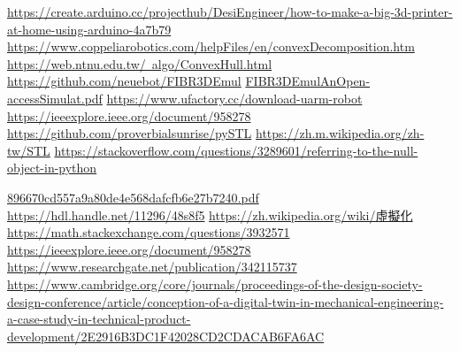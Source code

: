 \newpage
\renewcommand\bibname{參~考~文~獻}
\begin{thebibliography}{99}  %
\href{https://create.arduino.cc/projecthub/DesiEngineer/how-to-make-a-big-3d-printer-at-home-using-arduino-4a7b79}{https://create.arduino.cc/projecthub/DesiEngineer/how-to-make-a-big-3d-printer-at-home-using-arduino-4a7b79}
\href{https://www.coppeliarobotics.com/helpFiles/en/convexDecomposition.htm}{https://www.coppeliarobotics.com/helpFiles/en/convexDecomposition.htm}
\href{https://web.ntnu.edu.tw/~algo/ConvexHull.html}{https://web.ntnu.edu.tw/~algo/ConvexHull.html}
\href{https://github.com/neuebot/FIBR3DEmul}{https://github.com/neuebot/FIBR3DEmul}
\href{https://repositorium.sdum.uminho.pt/bitstream/1822/69730/1/Faria2020_Article_FIBR3DEmulAnOpen-accessSimulat.pdf}{FIBR3DEmulAnOpen-accessSimulat.pdf}
\href{https://www.ufactory.cc/download-uarm-robot}{https://www.ufactory.cc/download-uarm-robot}
\href{https://ieeexplore.ieee.org/document/958278}{https://ieeexplore.ieee.org/document/958278}
\href{https://github.com/proverbialsunrise/pySTL}{https://github.com/proverbialsunrise/pySTL}
\href{https://zh.m.wikipedia.org/zh-tw/STL}{https://zh.m.wikipedia.org/zh-tw/STL}
\href{https://stackoverflow.com/questions/3289601/referring-to-the-null-object-in-python}{https://stackoverflow.com/questions/3289601/referring-to-the-null-object-in-python}

\href{https://www.ufactory.cc/_files/ugd/896670_cd557a9a80de4e568dafcfb6e27b7240.pdf}{896670cd557a9a80de4e568dafcfb6e27b7240.pdf}
\href{https://hdl.handle.net/11296/48s8f5}{https://hdl.handle.net/11296/48s8f5}
\href{https://zh.wikipedia.org/wiki/%E8%99%9B%E6%93%AC%E5%8C%96}{https://zh.wikipedia.org/wiki/虛擬化}
\href{https://math.stackexchange.com/questions/3932571/how-to-integrate-over-all-space-in-polar-coordinates}{https://math.stackexchange.com/questions/3932571}
\href{https://ieeexplore.ieee.org/document/958278}{https://ieeexplore.ieee.org/document/958278}
\href{https://www.researchgate.net/publication/342115737_WHAT_IS_A_DIGITAL_TWIN_-_DEFINITIONS_AND_INSIGHTS_FROM_AN_INDUSTRIAL_CASE_STUDY_IN_TECHNICAL_PRODUCT_DEVELOPMENT}{https://www.researchgate.net/publication/342115737}
\href{https://www.cambridge.org/core/journals/proceedings-of-the-design-society-design-conference/article/conception-of-a-digital-twin-in-mechanical-engineering-a-case-study-in-technical-product-development/2E2916B3DC1F42028CD2CDACAB6FA6AC}{https://www.cambridge.org/core/journals/proceedings-of-the-design-society-design-conference/article/conception-of-a-digital-twin-in-mechanical-engineering-a-case-study-in-technical-product-development/2E2916B3DC1F42028CD2CDACAB6FA6AC}
%
\end{thebibliography}
\newpage 